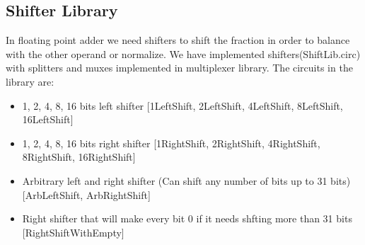 \documentclass[12pt]{article}
\begin{document}
\subsection{Shifter Library}
In floating point adder we need shifters to shift the fraction in order to balance with the other operand or normalize. We have implemented shifters(ShiftLib.circ) with splitters and muxes implemented in multiplexer library. The circuits in the library are:
\begin{itemize}
    \item 1, 2, 4, 8, 16 bits left shifter [1LeftShift, 2LeftShift, 4LeftShift, 8LeftShift, 16LeftShift]
    \item 1, 2, 4, 8, 16 bits right shifter [1RightShift, 2RightShift, 4RightShift, 8RightShift, 16RightShift]
    \item Arbitrary left and right shifter (Can shift any number of bits up to 31 bits) [ArbLeftShift, ArbRightShift]
    \item Right shifter that will make every bit 0 if it needs shfting more than 31 bits [RightShiftWithEmpty]
\end{itemize}
\end{document}
